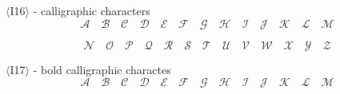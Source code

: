 \documentclass{book}
\begin{document}

$\langle$I16$\rangle$ - calligraphic characters
$$\mathcal{A}\quad \mathcal{B}\quad \mathcal{C}\quad \mathcal{D}\quad
\mathcal{E}\quad \mathcal{F}\quad \mathcal{G}\quad \mathcal{H}\quad 
\mathcal{I}\quad \mathcal{J}\quad \mathcal{K}\quad \mathcal{L}\quad 
\mathcal{M}$$ 

$$\mathcal{N}\quad \mathcal{O}\quad \mathcal{P}\quad 
\mathcal{Q}\quad \mathcal{R}\quad \mathcal{S}\quad \mathcal{T}\quad 
\mathcal{U}\quad \mathcal{V}\quad \mathcal{W}\quad \mathcal{X}\quad 
\mathcal{Y}\quad \mathcal{Z}$$

$\langle$I17$\rangle$ - bold calligraphic charactes
$$\mathbf{\mathcal{A}}\quad \mathbf{\mathcal{B}}\quad \mathbf{\mathcal{C}}\quad \mathbf{\mathcal{D}}\quad
\mathbf{\mathcal{E}}\quad \mathbf{\mathcal{F}}\quad \mathbf{\mathcal{G}}\quad \mathbf{\mathcal{H}}\quad 
\mathbf{\mathcal{I}}\quad \mathbf{\mathcal{J}}\quad \mathbf{\mathcal{K}}\quad \mathbf{\mathcal{L}}\quad 
\mathbf{\mathcal{M}}$$
\end{document}

